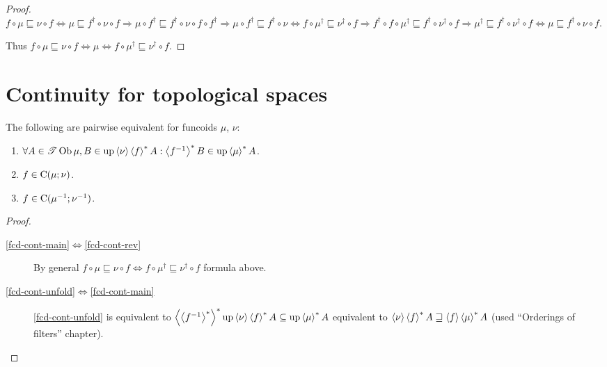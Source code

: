 \begin{proof}
$f \circ \mu \sqsubseteq \nu \circ f \Leftrightarrow \mu
\sqsubseteq f^{\dagger} \circ \nu \circ f \Rightarrow \mu \circ
f^{\dagger} \sqsubseteq f^{\dagger} \circ \nu \circ f \circ f^{\dagger}
\Rightarrow \mu \circ f^{\dagger} \sqsubseteq f^{\dagger} \circ \nu
\Leftrightarrow f \circ \mu^{\dagger} \sqsubseteq \nu^{\dagger} \circ f
\Rightarrow f^{\dagger} \circ f \circ \mu^{\dagger} \sqsubseteq
f^{\dagger} \circ \nu^{\dagger} \circ f \Rightarrow \mu^{\dagger}
\sqsubseteq f^{\dagger} \circ \nu^{\dagger} \circ f \Leftrightarrow \mu
\sqsubseteq f^{\dagger} \circ \nu \circ f$.

Thus $f \circ \mu \sqsubseteq \nu \circ f \Leftrightarrow \mu \Leftrightarrow
f \circ \mu^{\dagger} \sqsubseteq \nu^{\dagger} \circ f$.
\end{proof}

\section{Continuity for topological spaces}

\begin{prop}
  The following are pairwise equivalent for funcoids $\mu$, $\nu$:
  \begin{enumerate}
    \item\label{fcd-cont-unfold} $\forall A \in \mathscr{T} \operatorname{Ob} \mu, B \in \operatorname{up}
    \left\langle \nu\right\rangle \left\langle f\right\rangle ^{\ast} A : \left\langle f^{- 1}\right\rangle ^{\ast}
    B \in \operatorname{up} \left\langle \mu\right\rangle ^{\ast} A$.

    \item\label{fcd-cont-main}  $f \in \mathrm{C} (\mu; \nu)$.

    \item\label{fcd-cont-rev} $f \in \mathrm{C} (\mu^{- 1} ; \nu^{- 1})$.
  \end{enumerate}
\end{prop}

\begin{proof}
  ~
  \begin{description}
  \item[\ref{fcd-cont-main}$\Leftrightarrow$\ref{fcd-cont-rev}] By general $f \circ \mu \sqsubseteq \nu \circ
  f \Leftrightarrow f \circ \mu^{\dagger} \sqsubseteq \nu^{\dagger}
  \circ f$ formula above.

  \item[\ref{fcd-cont-unfold}$\Leftrightarrow$\ref{fcd-cont-main}] \ref{fcd-cont-unfold} is equivalent to
  $\left\langle \left\langle f^{- 1}\right\rangle ^{\ast}\right\rangle ^{\ast}
  \operatorname{up} \left\langle \nu\right\rangle \left\langle f\right\rangle ^{\ast} A \subseteq \operatorname{up}
  \left\langle \mu\right\rangle ^{\ast} A$ equivalent to $\left\langle \nu\right\rangle \left\langle f\right\rangle ^{\ast}
  A \sqsupseteq \left\langle f\right\rangle \left\langle \mu\right\rangle ^{\ast} A$
  (used ``Orderings of filters'' chapter).
  \end{description}
\end{proof}


